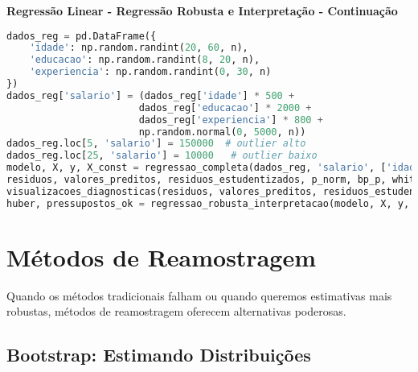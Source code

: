 \begin{examplebox}
\textbf{Regressão Linear - Regressão Robusta e Interpretação - Continuação}
\begin{lstlisting}[language=Python]
dados_reg = pd.DataFrame({
    'idade': np.random.randint(20, 60, n),
    'educacao': np.random.randint(8, 20, n),
    'experiencia': np.random.randint(0, 30, n)
})
dados_reg['salario'] = (dados_reg['idade'] * 500 + 
                       dados_reg['educacao'] * 2000 + 
                       dados_reg['experiencia'] * 800 + 
                       np.random.normal(0, 5000, n))
dados_reg.loc[5, 'salario'] = 150000  # outlier alto
dados_reg.loc[25, 'salario'] = 10000   # outlier baixo
modelo, X, y, X_const = regressao_completa(dados_reg, 'salario', ['idade', 'educacao', 'experiencia'])
residuos, valores_preditos, residuos_estudentizados, p_norm, bp_p, white_p, dw_stat, outliers_residuos = diagnosticos_residuos(modelo, X_const)
visualizacoes_diagnosticas(residuos, valores_preditos, residuos_estudentizados, dados_reg, ['idade', 'educacao', 'experiencia'])
huber, pressupostos_ok = regressao_robusta_interpretacao(modelo, X, y, ['idade', 'educacao', 'experiencia'], p_norm, bp_p, white_p, dw_stat, outliers_residuos)
\end{lstlisting}
\end{examplebox}

\section{Métodos de Reamostragem}

Quando os métodos tradicionais falham ou quando queremos estimativas mais robustas, métodos de reamostragem oferecem alternativas poderosas.

\subsection{Bootstrap: Estimando Distribuições}

